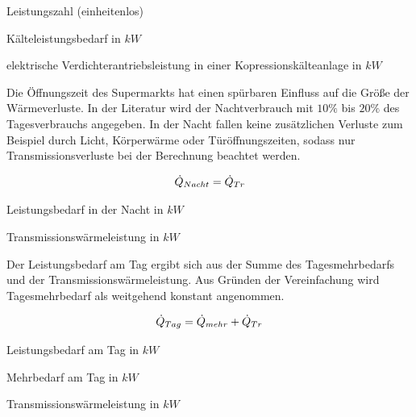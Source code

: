 \begin{description}[\dth]

	\item[$\epsilon$] Leistungszahl (einheitenlos)
	\item[$\pkalt$] Kälteleistungsbedarf in $kW$
	\item[$P$] elektrische Verdichterantriebsleistung in einer
		Kopressionskälteanlage in $kW$

\end{description}
\vspace{0.5cm}

Die Öffnungszeit des Supermarkts hat einen spürbaren Einfluss auf die Größe der
Wärmeverluste. In der Literatur wird der Nachtverbrauch mit $10\%$ bis $20\%$
des Tagesverbrauchs angegeben\cite{kauffeld}.  In der Nacht fallen keine
zusätzlichen Verluste zum Beispiel durch Licht, Körperwärme oder
Türöffnungszeiten, sodass nur Transmissionsverluste bei der Berechnung beachtet
werden.

\begin{equation}
	\dot{Q}_{Nacht}=\ptrans
\label{pnacht}
\end{equation}

\begin{description}[\dth]

	\item[$\pnacht$] Leistungsbedarf in der Nacht in $kW$
	\item[$\ptrans$] Transmissionswärmeleistung in $kW$

\end{description}
\vspace{0.5cm}


Der Leistungsbedarf am Tag ergibt sich aus der Summe des Tagesmehrbedarfs und
der Transmissionswärmeleistung. Aus Gründen der Vereinfachung wird
Tagesmehrbedarf als weitgehend konstant angenommen.

\begin{equation}
	\ptag = \pmehr + \ptrans
\label{ptag}
\end{equation}

\begin{description}[\dth]

	\item[$\ptag$] Leistungsbedarf am Tag in $kW$
	\item[$\pmehr$] Mehrbedarf am Tag in $kW$
	\item[$\ptrans$] Transmissionswärmeleistung in $kW$

\end{description}
\vspace{0.5cm}

